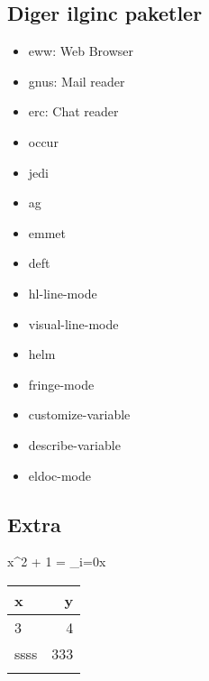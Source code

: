 \documentclass[11pt]{article}
\begin{document}
\subsection{Diger ilginc paketler}
\label{sec-4-3}

\begin{itemize}
\item eww: Web Browser

\item gnus: Mail reader

\item erc: Chat reader

\item occur

\item jedi

\item ag

\item emmet

\item deft

\item hl-line-mode

\item visual-line-mode

\item helm

\item fringe-mode

\item customize-variable

\item describe-variable

\item eldoc-mode
\end{itemize}

\subsection{Extra}
\label{sec-4-4}

x^2 + 1 = \sum_{i=0}{x}


\begin{center}
\begin{tabular}{lr}
x & y\\
\hline
3 & 4\\
ssss & 333\\
 & \\
\end{tabular}
\end{center}
\end{document}
